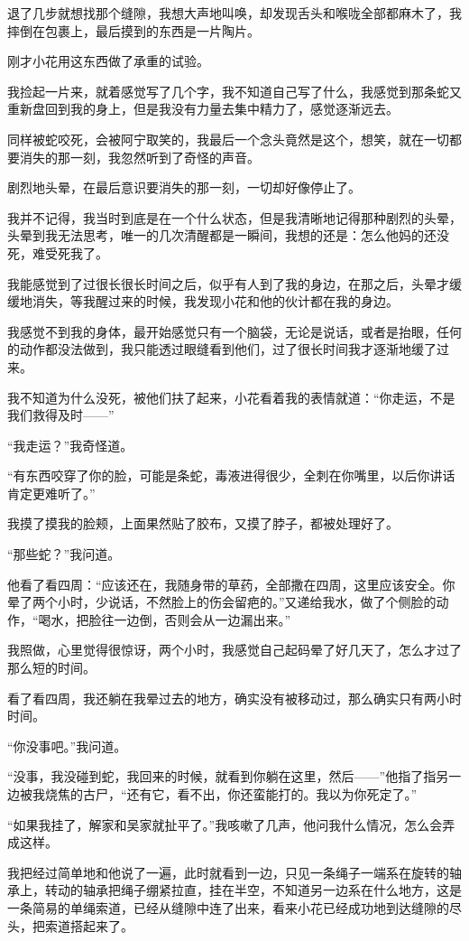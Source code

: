 退了几步就想找那个缝隙，我想大声地叫唤，却发现舌头和喉咙全部都麻木了，我摔倒在包裹上，最后摸到的东西是一片陶片。

刚才小花用这东西做了承重的试验。

我捡起一片来，就着感觉写了几个字，我不知道自己写了什么，我感觉到那条蛇又重新盘回到我的身上，但是我没有力量去集中精力了，感觉逐渐远去。

同样被蛇咬死，会被阿宁取笑的，我最后一个念头竟然是这个，想笑，就在一切都要消失的那一刻，我忽然听到了奇怪的声音。

剧烈地头晕，在最后意识要消失的那一刻，一切却好像停止了。

我并不记得，我当时到底是在一个什么状态，但是我清晰地记得那种剧烈的头晕，头晕到我无法思考，唯一的几次清醒都是一瞬间，我想的还是：怎么他妈的还没死，难受死我了。

我能感觉到了过很长很长时间之后，似乎有人到了我的身边，在那之后，头晕才缓缓地消失，等我醒过来的时候，我发现小花和他的伙计都在我的身边。

我感觉不到我的身体，最开始感觉只有一个脑袋，无论是说话，或者是抬眼，任何的动作都没法做到，我只能透过眼缝看到他们，过了很长时间我才逐渐地缓了过来。

我不知道为什么没死，被他们扶了起来，小花看着我的表情就道：“你走运，不是我们救得及时——”

“我走运？”我奇怪道。

“有东西咬穿了你的脸，可能是条蛇，毒液进得很少，全刺在你嘴里，以后你讲话肯定更难听了。”

我摸了摸我的脸颊，上面果然贴了胶布，又摸了脖子，都被处理好了。

“那些蛇？”我问道。

他看了看四周：“应该还在，我随身带的草药，全部撒在四周，这里应该安全。你晕了两个小时，少说话，不然脸上的伤会留疤的。”又递给我水，做了个侧脸的动作，“喝水，把脸往一边倒，否则会从一边漏出来。”

我照做，心里觉得很惊讶，两个小时，我感觉自己起码晕了好几天了，怎么才过了那么短的时间。

看了看四周，我还躺在我晕过去的地方，确实没有被移动过，那么确实只有两小时时间。

“你没事吧。”我问道。

“没事，我没碰到蛇，我回来的时候，就看到你躺在这里，然后——”他指了指另一边被我烧焦的古尸，“还有它，看不出，你还蛮能打的。我以为你死定了。”

“如果我挂了，解家和吴家就扯平了。”我咳嗽了几声，他问我什么情况，怎么会弄成这样。

我把经过简单地和他说了一遍，此时就看到一边，只见一条绳子一端系在旋转的轴承上，转动的轴承把绳子绷紧拉直，挂在半空，不知道另一边系在什么地方，这是一条简易的单绳索道，已经从缝隙中连了出来，看来小花已经成功地到达缝隙的尽头，把索道搭起来了。

